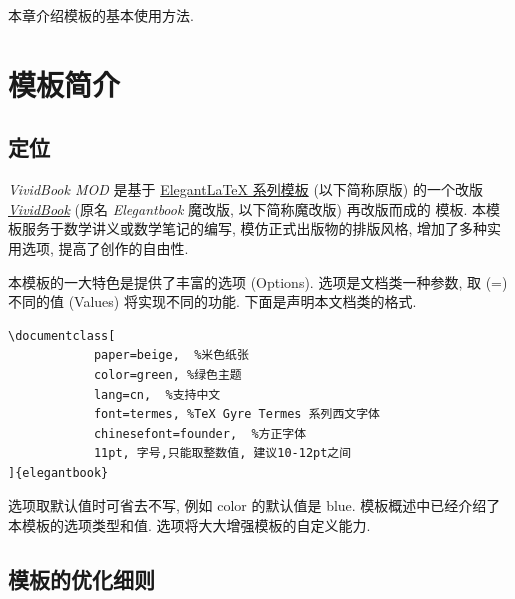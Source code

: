 \documentclass[../book.tex]{subfiles}
\begin{document}
本章介绍模板的基本使用方法.

\lace
\section{模板简介}

    \subsection{定位}

\textit{VividBook MOD} 是基于 \href{https://elegantlatex.org/}{Elegant\LaTeX{} 系列模板} (以下简称原版) 的一个改版 \textit{\href{https://github.com/Azure1210/VividBooK}{VividBook}} (原名 \textit{Elegantbook} 魔改版, 以下简称魔改版) 再改版而成的 \LaTeXe{} 模板. 本模板服务于数学讲义或数学笔记的编写, 模仿正式出版物的排版风格, 增加了多种实用选项, 提高了创作的自由性. 

本模板的一大特色是提供了丰富的选项 (Options). 选项是文档类一种参数, 取 (=) 不同的值 (Values) 将实现不同的功能. 下面是声明本文档类的格式.

\begin{lstlisting}
\documentclass[
            paper=beige,  %米色纸张
            color=green, %绿色主题
            lang=cn,  %支持中文
            font=termes, %TeX Gyre Termes 系列西文字体
            chinesefont=founder,  %方正字体
            11pt, 字号,只能取整数值, 建议10-12pt之间
]{elegantbook}
\end{lstlisting}

选项取默认值时可省去不写, 例如 color 的默认值是 blue. 模板概述中已经介绍了本模板的选项类型和值. 选项将大大增强模板的自定义能力.

    \subsection{模板的优化细则}
\end{document}

